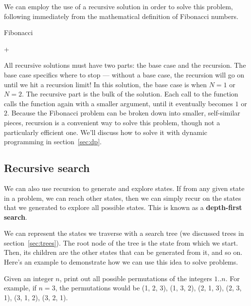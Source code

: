 We can employ the use of a recursive solution in order to solve this problem, following immediately from the mathematical definition of Fibonacci numbers.

\begin{algorithm}[H]
\caption{Fibonacci}
\begin{algorithmic}

        \State {}
    \Else
        \State \Return {} + 
    \EndIf
\EndFunction

\end{algorithmic}
\end{algorithm}

All recursive solutions must have two parts: the base case and the recursion.  The base case specifics where to stop --- without a base case, the recursion will go on until we hit a recursion limit!  In this solution, the base case is when $ N = 1 $ or $ N = 2 $.  The recursive part is the bulk of the solution.  Each call to the function calls the function again with a smaller argument, until it eventually becomes $ 1 $ or $ 2 $.  Because the Fibonacci problem can be broken down into smaller, self-similar pieces, recursion is a convenient way to solve this problem, though not a particularly efficient one. We'll discuss how to solve it with dynamic programming in section~\ref{sec:dp}.


\subsection{Recursive search} \label{recursive-search}
We can also use recursion to generate and explore states. If from any given state in a problem, we can reach other states, then we can simply recur on the states that we generated to explore all possible states. This is known as a \textbf{depth-first search}.

We can represent the states we traverse with a search tree (we discussed trees in section~\ref{sec:trees}). The root node of the tree is the state from which we start. Then, its children are the other states that can be generated from it, and so on. Here's an example to demonstrate how we can use this idea to solve problems.

\begin{Problem}
Given an integer $n$, print out all possible permutations of the integers $1..n$. For example, if $n=3$, the permutations would be (1, 2, 3), (1, 3, 2), (2, 1, 3), (2, 3, 1), (3, 1, 2), (3, 2, 1).
\end{Problem}

